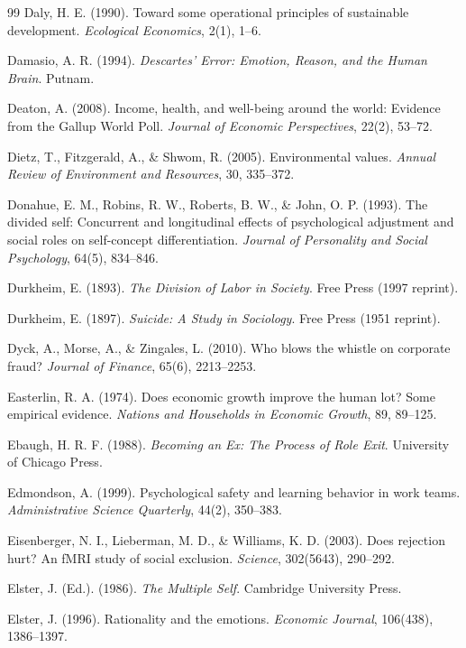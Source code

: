 \begin{thebibliography}{99}
Daly, H. E. (1990).
Toward some operational principles of sustainable development.
\textit{Ecological Economics}, 2(1), 1--6.

Damasio, A. R. (1994).
\textit{Descartes' Error: Emotion, Reason, and the Human Brain}.
Putnam.

Deaton, A. (2008).
Income, health, and well-being around the world: Evidence from the Gallup World Poll.
\textit{Journal of Economic Perspectives}, 22(2), 53--72.

Dietz, T., Fitzgerald, A., \& Shwom, R. (2005).
Environmental values.
\textit{Annual Review of Environment and Resources}, 30, 335--372.

Donahue, E. M., Robins, R. W., Roberts, B. W., \& John, O. P. (1993).
The divided self: Concurrent and longitudinal effects of psychological adjustment and social roles on self-concept differentiation.
\textit{Journal of Personality and Social Psychology}, 64(5), 834--846.

Durkheim, E. (1893).
\textit{The Division of Labor in Society}.
Free Press (1997 reprint).

Durkheim, E. (1897).
\textit{Suicide: A Study in Sociology}.
Free Press (1951 reprint).

Dyck, A., Morse, A., \& Zingales, L. (2010).
Who blows the whistle on corporate fraud?
\textit{Journal of Finance}, 65(6), 2213--2253.

Easterlin, R. A. (1974).
Does economic growth improve the human lot? Some empirical evidence.
\textit{Nations and Households in Economic Growth}, 89, 89--125.

Ebaugh, H. R. F. (1988).
\textit{Becoming an Ex: The Process of Role Exit}.
University of Chicago Press.

Edmondson, A. (1999).
Psychological safety and learning behavior in work teams.
\textit{Administrative Science Quarterly}, 44(2), 350--383.

Eisenberger, N. I., Lieberman, M. D., \& Williams, K. D. (2003).
Does rejection hurt? An fMRI study of social exclusion.
\textit{Science}, 302(5643), 290--292.

Elster, J. (Ed.). (1986).
\textit{The Multiple Self}.
Cambridge University Press.

Elster, J. (1996).
Rationality and the emotions.
\textit{Economic Journal}, 106(438), 1386--1397.


\end{thebibliography}
